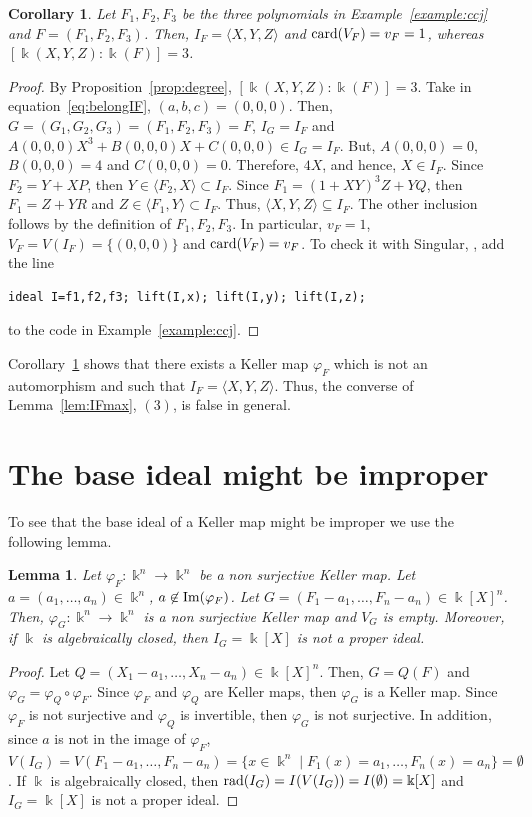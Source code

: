 \documentclass[11pt,reqno]{amsart}
\newtheorem{lemma}[theorem]{Lemma}
\newtheorem{corollary}[theorem]{Corollary}
\theoremstyle{definition}
\newcommand{\mbk}{\mbox{$\Bbbk$}}
\newcommand{\card}{\mbox{${\rm card}$}}
\newcommand{\rad}{\mbox{${\rm rad}$}}
\newcommand{\im}{\mbox{${\rm Im}$}}
\begin{document}
\begin{corollary}\label{cor:1=v=V}
Let $F_1,F_2,F_3$ be the three polynomials in {\rm Example~\ref{example:ccj}} and $F=(F_1,F_2,F_3)$. 
Then, $I_F=\langle X,Y,Z\rangle$ and $\card(V_F)=v_F=1$, whereas $[\mbk(X,Y,Z):\mbk(F)]=3$. 
\end{corollary}
\begin{proof}
By Proposition~\ref{prop:degree}, $[\mbk(X,Y,Z):\mbk(F)]=3$. Take in equation~\eqref{eq:belongIF}, $(a,b,c)=(0,0,0)$. Then, $G=(G_1,G_2,G_3)=(F_1,F_2,F_3)=F$, $I_G=I_F$ and
$A(0,0,0)X^3+B(0,0,0)X+C(0,0,0)\in I_G=I_F$. But, $A(0,0,0)=0$, $B(0,0,0)=4$ and $C(0,0,0)=0$. Therefore, 
$4X$, and hence, $X\in I_F$. Since $F_2=Y+XP$, then $Y\in \langle F_2,X\rangle\subset I_F$. 
Since $F_1=(1+XY)^3Z+YQ$, then $F_1=Z+YR$ and $Z\in \langle F_1,Y\rangle\subset I_F$. Thus, 
$\langle X,Y,Z\rangle\subseteq I_F$. The other inclusion follows by the definition of $F_1,F_2,F_3$.
In particular, $v_F=1$, $V_F=V(I_F)=\{(0,0,0)\}$ and $\card(V_F)=v_F$. 
To check it with {\sc Singular}, \cite{dgps}, add the line
\begin{verbatim}
ideal I=f1,f2,f3; lift(I,x); lift(I,y); lift(I,z);
\end{verbatim}
to the code in Example~\ref{example:ccj}. 
\end{proof}

Corollary~\ref{cor:1=v=V} shows that there exists a Keller map $\varphi_F$ which 
is not an automorphism and such that $I_{F}=\langle X,Y,Z\rangle$. Thus, 
the converse of Lemma~\ref{lem:IFmax}, $(3)$, is false in general. 

\section{The base ideal might be improper}

To see that the base ideal of a Keller map might be improper we use the following lemma. 

\begin{lemma}\label{lem:vgnobuit}
Let $\varphi_F:\mbk^n\to\mbk^n$ be a non surjective Keller map. 
Let $a=(a_1,\ldots,a_n)\in\mbk^n$, $a\not\in\im(\varphi_F)$. Let 
$G=(F_1-a_1,\ldots,F_n-a_n)\in\mbk[X]^n$. Then, 
$\varphi_G:\mbk^n\to\mbk^n$ is a non surjective Keller map and $V_G$ is empty. Moreover,
if $\mbk$ is algebraically closed, then $I_G=\mbk[X]$ is not a proper ideal.
\end{lemma}
\begin{proof}
Let $Q=(X_1-a_1,\ldots,X_n-a_n)\in\mbk[X]^n$. Then, $G=Q(F)$ and $\varphi_G=\varphi_Q\circ\varphi_F$. 
Since $\varphi_F$ and $\varphi_Q$ are Keller maps, then $\varphi_G$ is a Keller map. 
Since $\varphi_F$ is not surjective and $\varphi_Q$ is invertible, then $\varphi_G$ is 
not surjective. In addition, since $a$ is not in the image of $\varphi_F$, 
$V(I_G)=V(F_1-a_1,\ldots,F_n-a_n)=\{x\in\mbk^n\mid F_1(x)=a_1,\ldots,F_n(x)=a_n\}=\emptyset$.
If $\mbk$ is algebraically closed, then 
$\rad(I_G)=I(V(I_G))=I(\emptyset)=\mbk[X]$ and $I_G=\mbk[X]$ is not a proper ideal.  
\end{proof}
\end{document}
